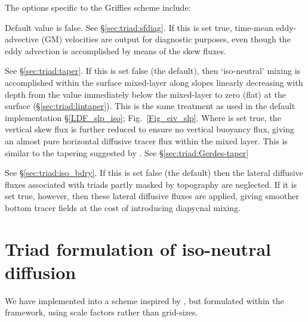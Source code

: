 The options specific to the Griffies scheme include:
\begin{description}[font=\normalfont]
\item[\np{ln\_traldf\_gdia}] Default value is false. See \S\ref{sec:triad:sfdiag}. If this is set true, time-mean
  eddy-advective (GM) velocities are output for diagnostic purposes, even
  though the eddy advection is accomplished by means of the skew
  fluxes.
\item[\np{ln\_traldf\_iso}] See \S\ref{sec:triad:taper}. If this is set false (the default), then
  `iso-neutral' mixing is accomplished within the surface mixed-layer
  along slopes linearly decreasing with depth from the value immediately below
  the mixed-layer to zero (flat) at the surface (\S\ref{sec:triad:lintaper}). This is the same
  treatment as used in the default implementation
  \S\ref{LDF_slp_iso}; Fig.~\ref{Fig_eiv_slp}.  Where
   is set true, the vertical skew flux is further
  reduced to ensure no vertical buoyancy flux, giving an almost pure
  horizontal diffusive tracer flux within the mixed layer. This is similar to
  the tapering suggested by \citet{Gerdes1991}. See \S\ref{sec:triad:Gerdes-taper}
\item[\np{ln\_traldf\_botmix}] See \S\ref{sec:triad:iso_bdry}. If this
  is set false (the default) then the lateral diffusive fluxes
  associated with triads partly masked by topography are neglected. If
  it is set true, however, then these lateral diffusive fluxes are
  applied, giving smoother bottom tracer fields at the cost of
  introducing diapycnal mixing.
\end{description}
\section{Triad formulation of iso-neutral diffusion}
\label{sec:triad:iso}
We have implemented into \NEMO a scheme inspired by \citet{Griffies_al_JPO98}, but formulated within the \NEMO
framework, using scale factors rather than grid-sizes.

